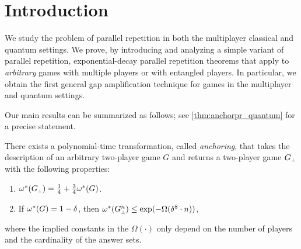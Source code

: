 \section{Introduction}\label{sec:anchorpr_intro}

We study the problem of parallel repetition in both the multiplayer classical and quantum settings. We prove, by introducing and analyzing a simple variant of parallel repetition, exponential-decay parallel repetition theorems that apply to \emph{arbitrary} games with multiple players or with entangled players. In particular, we obtain the first general gap amplification technique for games in the multiplayer and quantum settings.





Our main results can be summarized as follows; see \ref{thm:anchorpr_quantum} for a precise statement.

\begin{theorem}
\label{thm:main-informal}
There exists a polynomial-time transformation, called \emph{anchoring}, that takes the description of an arbitrary two-player game $G$ and returns a two-player game $G_\dummy$ with the following properties:
\begin{enumerate}
\item $\eval(G_\dummy)=\frac{1}{4}+\frac{3}{4}\eval(G)$.
\item If $\omega^*(G) = 1 - \delta$, then $ \eval(G_\dummy^n) \leq \exp(-\Omega(\delta^8 \cdot n))$,
\end{enumerate}
where the implied constants in the $\Omega(\cdot)$ only depend on the number of players and the cardinality of the answer sets. 
\end{theorem}

